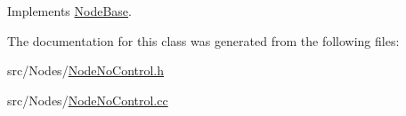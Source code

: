 Implements \hyperlink{classNodeBase_ae70b168f2bc7407c249594b1c614301c}{Node\+Base}.



The documentation for this class was generated from the following files\+:\begin{DoxyCompactItemize}
\item 
src/\+Nodes/\hyperlink{NodeNoControl_8h}{Node\+No\+Control.\+h}\item 
src/\+Nodes/\hyperlink{NodeNoControl_8cc}{Node\+No\+Control.\+cc}\end{DoxyCompactItemize}
